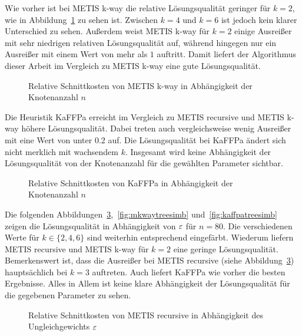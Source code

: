 Wie vorher ist bei METIS k-way die relative Lösungsqualität geringer für $k=2$, wie in Abbildung~\ref{fig:mkwaytreesnodes} zu sehen ist.
Zwischen $k=4$ und $k=6$ ist jedoch kein klarer Unterschied zu sehen.
Außerdem weist METIS k-way für $k=2$ einige Ausreißer mit sehr niedrigen relativen Lösungsqualität auf, während hingegen nur ein Ausreißer mit einem Wert von mehr als $1$ auftritt.
Damit liefert der Algorithmus dieser Arbeit im Vergleich zu METIS k-way eine gute Lösungsqualität.

\begin{figure}[H]
    \centering
    
    \caption{Relative Schnittkosten von METIS k-way in Abhängigkeit der Knotenanzahl $n$\label{fig:mkwaytreesnodes}}
\end{figure}

Die Heuristik KaFFPa erreicht im Vergleich zu METIS recursive und METIS k-way höhere Lösungsqualität.
Dabei treten auch vergleichsweise wenig Ausreißer mit eine Wert von unter $0.2$ auf.
Die Lösungsqualität bei KaFFPa ändert sich nicht merklich mit wachsendem $k$.
Insgesamt wird keine Abhängigkeit der Lösungsqualität von der Knotenanzahl für die gewählten Parameter sichtbar.

\begin{figure}[H]
    \centering
    
    \caption{Relative Schnittkosten von KaFFPa in Abhängigkeit der Knotenanzahl $n$\label{fig:kaffpatreesnodes}}
\end{figure}

Die folgenden Abbildungen~\ref{fig:mrectreesimb},~\ref{fig:mkwaytreesimb} und~\ref{fig:kaffpatreesimb} zeigen die Lösungsqualität in Abhängigkeit von $\varepsilon$ für $n=80$.
Die verschiedenen Werte für $k \in \{2,4,6\}$ sind weiterhin entsprechend eingefärbt.
Wiederum liefern METIS recursive und METIS k-way für $k=2$ eine geringe Lösungsqualität.
Bemerkenswert ist, dass die Ausreißer bei METIS recursive (siehe Abbildung~\ref{fig:mrectreesimb}) hauptsächlich bei $k=3$ auftreten.
Auch liefert KaFFPa wie vorher die besten Ergebnisse.
Alles in Allem ist keine klare Abhängigkeit der Lösungsqualität für die gegebenen Parameter zu sehen.

\begin{figure}[H]
    \centering
    
    \caption{Relative Schnittkosten von METIS recursive in Abhängigkeit des Ungleichgewichts $\varepsilon$\label{fig:mrectreesimb}}
\end{figure}

